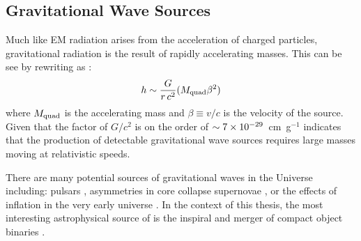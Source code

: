 \subsection{Gravitational Wave Sources}
\label{sec:intro_gw_source}
Much like EM radiation arises from the acceleration of charged particles, gravitational radiation is the result of rapidly accelerating masses. This can be see by rewriting  as \citep{Centrella+10}:
\begin{equation}
\label{eq:intro_quad}
h \apx \frac{G}{r\,c^2} (M_{\rm quad} \beta^2)
\end{equation}
\noindent where $M_{\rm quad}$ is the accelerating mass and $\beta \equiv v / c$ is the velocity of the source. Given that the factor of $G / c^2$ is on the order of $\sim7\times10^{-29}$~cm~g$^{-1}$ indicates that the production of detectable gravitational wave sources requires large masses moving at relativistic speeds.

There are many potential sources of gravitational waves in the Universe \citep[see e.g,][]{CutlerThorne02} including: pulsars \citep{Hewish+68, Jaranowski+98}, asymmetries in core collapse supernovae \citep[SN,][]{Dimmelmeier+01,Ott+06,Ott2009}, or the effects of inflation in the very early universe \citep{Turner1997,Maggiore2000}. In the context of this thesis, the most interesting astrophysical source of is the inspiral and merger of compact object binaries \citep[see e.g.,][]{Belczynski+02,Blanchet2002,Blanchet2006}.

